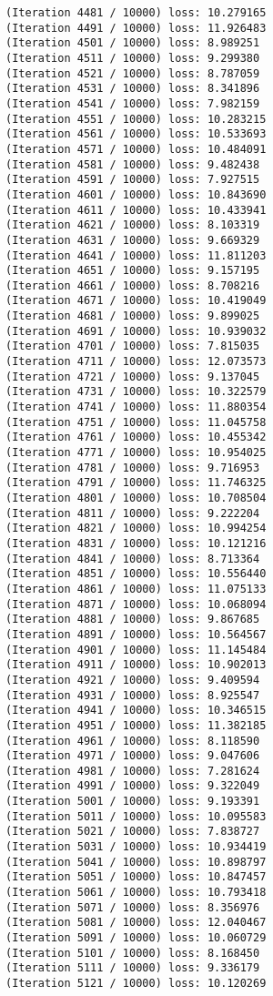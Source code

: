 \documentclass[11pt]{article}
\begin{document}
\begin{Verbatim}[commandchars=\\\{\}]
(Iteration 4481 / 10000) loss: 10.279165
(Iteration 4491 / 10000) loss: 11.926483
(Iteration 4501 / 10000) loss: 8.989251
(Iteration 4511 / 10000) loss: 9.299380
(Iteration 4521 / 10000) loss: 8.787059
(Iteration 4531 / 10000) loss: 8.341896
(Iteration 4541 / 10000) loss: 7.982159
(Iteration 4551 / 10000) loss: 10.283215
(Iteration 4561 / 10000) loss: 10.533693
(Iteration 4571 / 10000) loss: 10.484091
(Iteration 4581 / 10000) loss: 9.482438
(Iteration 4591 / 10000) loss: 7.927515
(Iteration 4601 / 10000) loss: 10.843690
(Iteration 4611 / 10000) loss: 10.433941
(Iteration 4621 / 10000) loss: 8.103319
(Iteration 4631 / 10000) loss: 9.669329
(Iteration 4641 / 10000) loss: 11.811203
(Iteration 4651 / 10000) loss: 9.157195
(Iteration 4661 / 10000) loss: 8.708216
(Iteration 4671 / 10000) loss: 10.419049
(Iteration 4681 / 10000) loss: 9.899025
(Iteration 4691 / 10000) loss: 10.939032
(Iteration 4701 / 10000) loss: 7.815035
(Iteration 4711 / 10000) loss: 12.073573
(Iteration 4721 / 10000) loss: 9.137045
(Iteration 4731 / 10000) loss: 10.322579
(Iteration 4741 / 10000) loss: 11.880354
(Iteration 4751 / 10000) loss: 11.045758
(Iteration 4761 / 10000) loss: 10.455342
(Iteration 4771 / 10000) loss: 10.954025
(Iteration 4781 / 10000) loss: 9.716953
(Iteration 4791 / 10000) loss: 11.746325
(Iteration 4801 / 10000) loss: 10.708504
(Iteration 4811 / 10000) loss: 9.222204
(Iteration 4821 / 10000) loss: 10.994254
(Iteration 4831 / 10000) loss: 10.121216
(Iteration 4841 / 10000) loss: 8.713364
(Iteration 4851 / 10000) loss: 10.556440
(Iteration 4861 / 10000) loss: 11.075133
(Iteration 4871 / 10000) loss: 10.068094
(Iteration 4881 / 10000) loss: 9.867685
(Iteration 4891 / 10000) loss: 10.564567
(Iteration 4901 / 10000) loss: 11.145484
(Iteration 4911 / 10000) loss: 10.902013
(Iteration 4921 / 10000) loss: 9.409594
(Iteration 4931 / 10000) loss: 8.925547
(Iteration 4941 / 10000) loss: 10.346515
(Iteration 4951 / 10000) loss: 11.382185
(Iteration 4961 / 10000) loss: 8.118590
(Iteration 4971 / 10000) loss: 9.047606
(Iteration 4981 / 10000) loss: 7.281624
(Iteration 4991 / 10000) loss: 9.322049
(Iteration 5001 / 10000) loss: 9.193391
(Iteration 5011 / 10000) loss: 10.095583
(Iteration 5021 / 10000) loss: 7.838727
(Iteration 5031 / 10000) loss: 10.934419
(Iteration 5041 / 10000) loss: 10.898797
(Iteration 5051 / 10000) loss: 10.847457
(Iteration 5061 / 10000) loss: 10.793418
(Iteration 5071 / 10000) loss: 8.356976
(Iteration 5081 / 10000) loss: 12.040467
(Iteration 5091 / 10000) loss: 10.060729
(Iteration 5101 / 10000) loss: 8.168450
(Iteration 5111 / 10000) loss: 9.336179
(Iteration 5121 / 10000) loss: 10.120269

\end{Verbatim}
\end{document}
